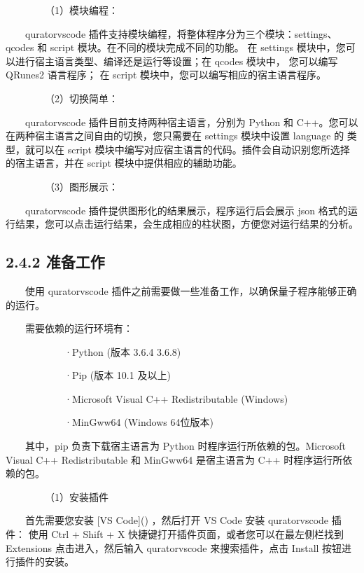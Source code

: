 \documentclass[a4paper,11pt,english]{sphinxmanual}
\begin{document}
\sphinxAtStartPar
    （1）模块编程：

\sphinxAtStartPar
​  qurator\sphinxhyphen{}vscode 插件支持模块编程，将整体程序分为三个模块：settings、qcodes 和 script 模块。在不同的模块完成不同的功能。 在 settings 模块中，您可以进行宿主语言类型、编译还是运行等设置；在 qcodes 模块中， 您可以编写 QRunes2 语言程序； 在 script 模块中，您可以编写相应的宿主语言程序。

\sphinxAtStartPar
    （2）切换简单：

\sphinxAtStartPar
  ​qurator\sphinxhyphen{}vscode 插件目前支持两种宿主语言，分别为 Python 和 C++。您可以在两种宿主语言之间自由的切换，您只需要在 settings 模块中设置 language 的 类型，就可以在 script 模块中编写对应宿主语言的代码。插件会自动识别您所选择的宿主语言，并在 script 模块中提供相应的辅助功能。

\sphinxAtStartPar
    （3）图形展示：

\sphinxAtStartPar
​  qurator\sphinxhyphen{}vscode 插件提供图形化的结果展示，程序运行后会展示 json 格式的运行结果，您可以点击运行结果，会生成相应的柱状图，方便您对运行结果的分析。


\subsection{2.4.2 准备工作}
\label{\detokenize{rst/_u9644_u5f552_u91cf_u5b50_u7f16_u7a0b_u5de5_u5177_u7684_u5b89_u88c5_u4e0e_u914d_u7f6e:id3}}
\sphinxAtStartPar
​  使用 qurator\sphinxhyphen{}vscode 插件之前需要做一些准备工作，以确保量子程序能够正确的运行。

\sphinxAtStartPar
​  需要依赖的运行环境有：

\sphinxAtStartPar
​  ​  ​  ​·Python (版本 3.6.4 \sphinxhyphen{} 3.6.8)

\sphinxAtStartPar
​  ​  ​  ​·Pip (版本 10.1 及以上)

\sphinxAtStartPar
​  ​  ​  ·Microsoft Visual C++ Redistributable (Windows)

\sphinxAtStartPar
​  ​  ​  ·MinGw\sphinxhyphen{}w64 (Windows 64位版本)

\sphinxAtStartPar
​  其中，pip 负责下载宿主语言为 Python 时程序运行所依赖的包。Microsoft Visual C++ Redistributable 和 MinGw\sphinxhyphen{}w64 是宿主语言为 C++ 时程序运行所依赖的包。

\sphinxAtStartPar
​    （1）安装插件

\sphinxAtStartPar
​  首先需要您安装 {[}VS Code{]}() ，然后打开 VS Code 安装 qurator\sphinxhyphen{}vscode 插件： 使用 Ctrl + Shift + X 快捷键打开插件页面，或者您可以在最左侧栏找到 Extensions 点击进入，然后输入 qurator\sphinxhyphen{}vscode 来搜索插件，点击 Install 按钮进行插件的安装。
\end{document}
